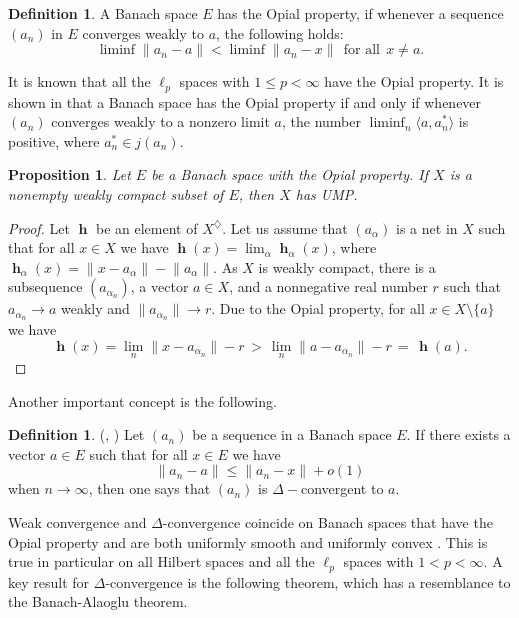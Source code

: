 \documentclass[a4paper,12pt]{article}
\newtheorem{proposition}[theorem]{Proposition}
\theoremstyle{definition}
\newtheorem{definition}[theorem]{Definition}
\numberwithin{equation}{section}
\newcommand{\norm}[1]{\lVert#1\rVert} %
\newcommand{\dpair}[2]{\langle#1, #2\rangle} %
\numberwithin{equation}{section}
\DeclareMathOperator{\h}{\mathbf{h}} %
\begin{document}
\begin{definition}\label{Opial} 
A Banach space $E$ has the Opial property, 
if whenever a sequence $(a_n)$ in $E$ 
converges weakly to $a$, the following holds: 
$$
\liminf \norm{a_n-a} < \liminf \norm{a_n - x}\ \ 
        \text{for all}\ \ x \neq a.
$$
\end{definition}

It is known that all the $\ell_p$ spaces with 
$1 \leq p < \infty$ have the Opial property. 
It is shown in 
\cite[Theorem~1]{DalbySims1996} that a Banach 
space has the Opial property if and only if 
whenever $(a_n)$ converges weakly to a 
nonzero limit $a$, the number 
$\liminf_n \dpair{a}{a_n^*}$ is positive, 
where $a_n^* \in j(a_n)$. 

\begin{proposition}\label{prop:WeakCompUMP}
Let $E$ be a Banach space with the Opial 
property. If $X$ is a nonempty weakly compact 
subset of $E$, then $X$ has UMP. 
\end{proposition}

\begin{proof}
Let $\h$ be an element of $X^\diamondsuit$. 
Let us assume that $(a_\alpha)$ is a net in 
$X$ such that for all $x \in X$ we have
$\h(x) = \lim_\alpha\h_{\alpha}(x)$, where
$\h_\alpha(x) = \norm{x-a_\alpha} 
    - \norm{a_\alpha}$.
As $X$ is weakly compact, there is a subsequence 
$(a_{\alpha_n})$, a vector $a\in X$, and a 
nonnegative real number $r$ such that 
$a_{\alpha_n}\to a$ weakly and 
$\norm{a_{\alpha_n}}\to r$.   
Due to the Opial property, for all 
$x \in X \setminus \{a\}$ we have
$$
\h(x) = \lim_{n} \norm{x - a_{\alpha_n}} - r 
    \,>\, \lim_{n} \norm{a - a_{\alpha_n}} - r 
    \,=\, \h(a).
$$
\end{proof}

Another important concept is the following.

\begin{definition}
(\cite{Lim1977}, \cite[Definition~3.1]{Solimini-Tintarev2015})  
Let $(a_n)$ be a sequence in a Banach space 
$E$. If there exists a vector $a \in E$ such 
that for all $x \in E$ we have 
$$
    \norm{a_n -a} \leq \norm{a_n - x} + o(1)
$$
when $n\to \infty$, then one says that 
$(a_n)$ is $\Delta-$convergent to $a$. 
\end{definition}

Weak convergence and $\Delta$-convergence 
coincide on Banach spaces that have the Opial 
property and are both uniformly smooth and 
uniformly convex 
\cite[Theorem~3.19]{Solimini-Tintarev2015}.
This is true in particular on all Hilbert 
spaces and all the $\ell_p$ spaces with 
$1<p<\infty$.
A key result for $\Delta$-convergence is the 
following theorem, which has a resemblance to
the Banach-Alaoglu theorem.
\end{document}
